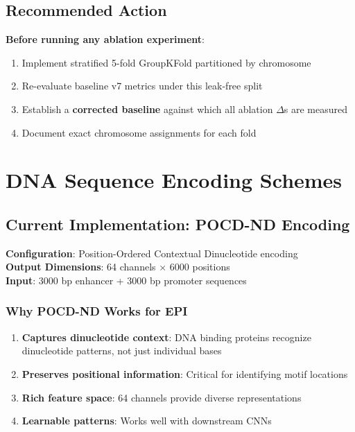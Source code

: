 \documentclass[11pt,a4paper]{article}
\begin{document}
\subsection{Recommended Action}

\textbf{Before running any ablation experiment}:
\begin{enumerate}
    \item Implement stratified 5-fold GroupKFold partitioned by chromosome
    \item Re-evaluate baseline v7 metrics under this leak-free split
    \item Establish a \textbf{corrected baseline} against which all ablation $\Delta$s are measured
    \item Document exact chromosome assignments for each fold
\end{enumerate}

\section{DNA Sequence Encoding Schemes}

\subsection{Current Implementation: POCD-ND Encoding}

\textbf{Configuration}: Position-Ordered Contextual Dinucleotide encoding\\
\textbf{Output Dimensions}: 64 channels $\times$ 6000 positions\\
\textbf{Input}: 3000 bp enhancer + 3000 bp promoter sequences

\subsubsection{Why POCD-ND Works for EPI}

\begin{enumerate}
    \item \textbf{Captures dinucleotide context}: DNA binding proteins recognize dinucleotide patterns, not just individual bases
    \item \textbf{Preserves positional information}: Critical for identifying motif locations
    \item \textbf{Rich feature space}: 64 channels provide diverse representations
    \item \textbf{Learnable patterns}: Works well with downstream CNNs
\end{enumerate}
\end{document}
